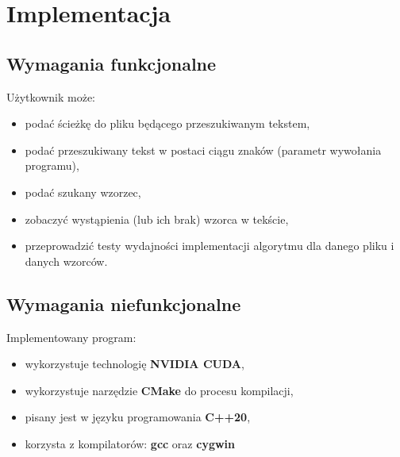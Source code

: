 \section{Implementacja}
\label{chapter:3}
\subsection{Wymagania funkcjonalne}
Użytkownik może:
\begin{itemize}
    \item podać ścieżkę do pliku będącego przeszukiwanym tekstem,
    \item podać przeszukiwany tekst w postaci ciągu znaków (parametr wywołania programu),
    \item podać szukany wzorzec,
    \item zobaczyć wystąpienia (lub ich brak) wzorca w tekście,
    \item przeprowadzić testy wydajności implementacji algorytmu dla danego pliku i danych wzorców.
\end{itemize}
\subsection{Wymagania niefunkcjonalne}
Implementowany program:
\begin{itemize}
    \item wykorzystuje technologię \textbf{NVIDIA CUDA},
    \item wykorzystuje narzędzie \textbf{CMake} do procesu kompilacji,
    \item pisany jest w języku programowania \textbf{C++20},
    \item korzysta z kompilatorów: \textbf{gcc} oraz \textbf{cygwin}
\end{itemize}

\newpage
